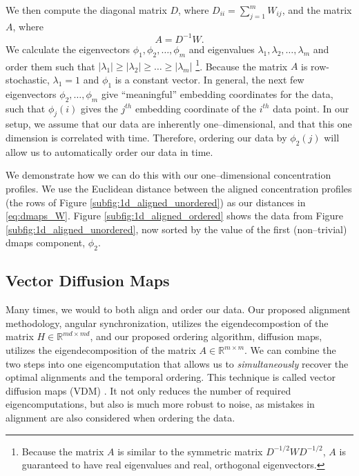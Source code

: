 \documentclass[11pt]{article}
\begin{document}
We then compute the diagonal matrix $D$, where $D_{ii} = \sum_{j=1}^{m} W_{ij}$, and the matrix $A$, where
\begin{equation} \label{eq:dmaps_A}
A = D^{-1} W.
\end{equation} 
%
We calculate the eigenvectors $\phi_1, \phi_2, \dots, \phi_m$ and eigenvalues $\lambda_1, \lambda_2, \dots, \lambda_m$ and order them such that $|\lambda_1| \ge |\lambda_2| \ge \dots \ge |\lambda_m|$ \footnote{Because the matrix $A$ is similar to the symmetric matrix $D^{-1/2} W D^{-1/2}$, $A$ is guaranteed to have real eigenvalues and real, orthogonal eigenvectors.}. 
%
Because the matrix $A$ is row-stochastic, $\lambda_1=1$ and $\phi_1$ is a constant vector.
%
In general, the next few eigenvectors $\phi_2, \dots, \phi_m$ give ``meaningful'' embedding coordinates for the data, such that $\phi_j(i)$ gives the $j^{th}$ embedding coordinate of the $i^{th}$ data point. 
%
In our setup, we assume that our data are inherently one--dimensional, and that this one dimension is correlated with time.
%
Therefore, ordering our data by $\phi_2(j)$ will allow us to automatically order our data in time. 

We demonstrate how we can do this with our one--dimensional concentration profiles. 
%
We use the Euclidean distance between the aligned concentration profiles (the rows of Figure \ref{subfig:1d_aligned_unordered}) as our distances in \eqref{eq:dmaps_W}.
%
Figure \ref{subfig:1d_aligned_ordered} shows the data from Figure \ref{subfig:1d_aligned_unordered}, now sorted by the value of the first (non--trivial) dmaps component, $\phi_2$. 

\subsection{Vector Diffusion Maps}

Many times, we would to both align and order our data.
%
Our proposed alignment methodology, angular synchronization, utilizes the eigendecompostion of the matrix $H \in \mathbb{R}^{md \times md}$, and our proposed ordering algorithm, diffusion maps, utilizes the eigendecomposition of the matrix $A \in \mathbb{R}^{m \times m}$.
%
We can combine the two steps into one eigencomputation that allows us to {\em simultaneously} recover the optimal alignments and the temporal ordering.
%
This technique is called vector diffusion maps (VDM) \cite{singer2012vector}.
%
It not only reduces the number of required eigencomputations, but also is much more robust to noise, as mistakes in alignment are also considered when ordering the data.
\end{document}
